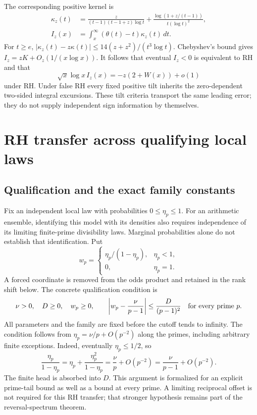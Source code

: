\documentclass[11pt]{article}
\theoremstyle{definition}
\begin{document}
The corresponding positive kernel is
\[
\begin{aligned}
 \kappa_z(t)&=
 \frac{z}{(t-1)(t-1+z)\log t}
 +\frac{\log(1+z/(t-1))}{t(\log t)^2},\\
 I_z(x)&=\int_x^\infty(\theta(t)-t)\kappa_z(t)\,dt.
\end{aligned}
\]
For $t\ge e$,
$|\kappa_z(t)-z\kappa(t)|\le14(z+z^2)/(t^3\log t)$.
Chebyshev's bound gives $I_z=zK+O_z(1/(x\log x))$.
It follows that eventual $I_z<0$ is equivalent to RH and that
\[
 \sqrt{x}\log x\, I_z(x)=-z(2+W(x))+o(1)
\]
under RH. Under false RH every fixed positive tilt inherits the
zero-dependent two-sided integral excursions.
These tilt criteria transport the same leading error; they do not
supply independent sign information by themselves.

\section{RH transfer across qualifying local laws}\label{sec:family-rh}

\subsection{Qualification and the exact family constants}
Fix an independent local law with probabilities $0\le\eta_p\le1$.
For an arithmetic ensemble, identifying this model with its densities also
requires independence of its limiting finite-prime divisibility laws.
Marginal probabilities alone do not establish that identification. Put
\[
 w_p=\begin{cases}\eta_p/(1-\eta_p),&\eta_p<1,\\0,&\eta_p=1.\end{cases}
\]
A forced coordinate is removed from the odds product and retained in
the rank shift below. The concrete qualification condition is
\begin{equation}\label{eq:family-quadratic}
 \nu>0,\quad D\ge0,\quad w_p\ge0,\qquad
 \left|w_p-\frac{\nu}{p-1}\right|\le\frac{D}{(p-1)^2}
 \quad\hbox{for every prime }p.
\end{equation}
All parameters and the family are fixed before the cutoff tends to infinity.
The condition follows from
$\eta_p=\nu/p+O(p^{-2})$ along the primes, including arbitrary finite
exceptions. Indeed, eventually $\eta_p\le1/2$, so
\[
 \frac{\eta_p}{1-\eta_p}
 =\eta_p+\frac{\eta_p^2}{1-\eta_p}
 =\frac{\nu}{p}+O(p^{-2})
 =\frac{\nu}{p-1}+O(p^{-2}).
\]
The finite head is absorbed into $D$. This argument is formalized for
an explicit prime-tail bound as well as a bound at every prime.
A limiting reciprocal offset is not required for this RH transfer;
that stronger hypothesis remains part of the reversal-spectrum theorem.
\end{document}

